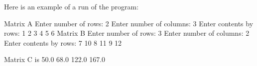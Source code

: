 \begin{exercise}
Here is an example of a run of the program:

\begin{stdout}
Matrix A
Enter number of rows: 2
Enter number of columns: 3
Enter contents by rows: 1 2 3 4 5 6
Matrix B
Enter number of rows: 3
Enter number of columns: 2
Enter contents by rows: 7 10 8 11 9 12

Matrix C is
50.0 68.0 
122.0 167.0
\end{stdout}

\end{exercise}
